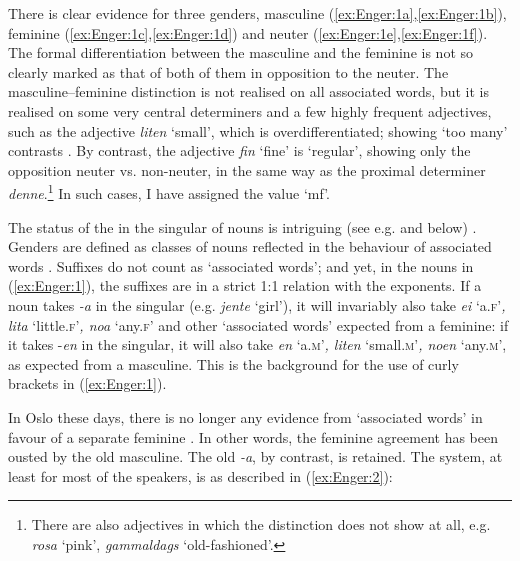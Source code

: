 \documentclass[output=paper]{langsci/langscibook}
\begin{document}
There is clear evidence for three genders, masculine (\ref{ex:Enger:1a},\ref{ex:Enger:1b}), feminine
(\ref{ex:Enger:1c},\ref{ex:Enger:1d}) and neuter (\ref{ex:Enger:1e},\ref{ex:Enger:1f}). The formal differentiation between the
masculine and the feminine is not so clearly marked as that of both of
them in opposition to the neuter. The masculine--feminine distinction
is not realised on all associated words, but it is realised on some very
central determiners and a few highly frequent adjectives, such as the
adjective \emph{liten} `small', which is overdifferentiated;
showing `too many' contrasts %
\citep[cf.][]{Corbett2007}%
%
. By contrast, the
adjective \emph{fin} `fine' is `regular', showing only the opposition
neuter vs. non-neuter, in the same way as the proximal determiner
\emph{denne}.\footnote{There are also adjectives in which the 
  distinction does not show at all, e.g. \emph{rosa} `pink',
  \emph{gammaldags} `old-fashioned'.} In such cases, I have assigned the
value `mf'.

The status of the  in the  singular of nouns is intriguing
%
(see e.g. %
\citealt{Enger12} %
%
 and  below)%
%
. Genders are defined as
classes of nouns reflected in the behaviour of associated words %
\citep{Corbett1991}%
%
. Suffixes do not count as `associated words'; and yet, in the
nouns in (\ref{ex:Enger:1}), the suffixes are in a strict 1:1 relation with the 
exponents. If a noun takes \emph{-a} in the  singular (e.g.
\emph{jente} `girl'), it will invariably also take \emph{ei}
`a.\textsc{f}'\emph{, lita} `little.\textsc{f}'\emph{, noa} `any.\textsc{f}' and other `associated
words' expected from a feminine: if it takes -\emph{en} in the 
singular, it will also take \emph{en} `a.\textsc{m}'\emph{, liten}
`small.\textsc{m}'\emph{, noen} `any.\textsc{m}', as expected from a masculine. This is
the background for the use of curly brackets in (\ref{ex:Enger:1}).

In Oslo these days, there is no longer any evidence from `associated
words' in favour of a separate feminine . In other words, the
feminine agreement has been ousted by the old masculine. The old 
\emph{-a}, by contrast, is retained. The system, at least for most of
the speakers, is as described in (\ref{ex:Enger:2}):
\end{document}
